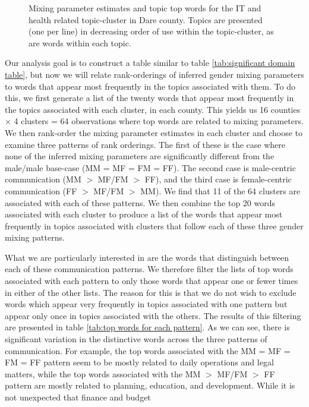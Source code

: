 \documentclass{pnastwo}
\begin{document}
\begin{article}
\begin{figure}
\begin{tabular}{m{}}
	\end{tabular}
	\caption{\label{tab: hoke 3 mp} Mixing parameter estimates and topic top words for the IT and health related topic-cluster in Dare county. Topics are presented (one per line) in decreasing order of use within the topic-cluster, as are words within each topic.}
\end{figure}

Our analysis goal is to construct a table similar to table \ref{tab:significant domain table}, but now we will relate rank-orderings of inferred gender mixing parameters to words that appear most frequently in the topics associated with them. To do this, we first generate a list of the twenty words that appear most frequently in the topics associated with each cluster, in each county. This yields us 16 counties $\times$ 4 clusters = 64 observations where top words are related to mixing parameters. We then rank-order the mixing parameter estimates in each cluster and choose to examine three patterns of rank orderings. The first of these is the case where none of the inferred mixing parameters are significantly different from the male/male base-case (MM = MF = FM = FF). The second case is male-centric communication (MM $>$ MF/FM $>$ FF), and the third case is female-centric communication (FF $>$ MF/FM $>$ MM). We find that 11 of the 64 clusters are associated with each of these patterns. We then combine the top 20 words associated with each cluster to produce a list of the words that appear most frequently in topics associated with clusters that follow each of these three gender mixing patterns. 

What we are particularly interested in are the words that distinguish between each of these communication patterns. We therefore filter the lists of top words associated with each pattern to only those words that appear one or fewer times in either of the other lists. The reason for this is that we do not wish to exclude words which appear very frequently in topics associated with one pattern but appear only once in topics associated with the others. The results of this filtering are presented in table \ref{tab:top words for each pattern}. As we can see, there is significant variation in the distinctive words across the three patterns of communication. For example, the top words associated with the MM = MF = FM = FF pattern seem to be mostly related to daily operations and legal matters, while the top words associated with the MM $>$ MF/FM $>$ FF pattern are mostly related to planning, education, and development. While it is not unexpected that finance and budget


\end{article}
\end{document}
